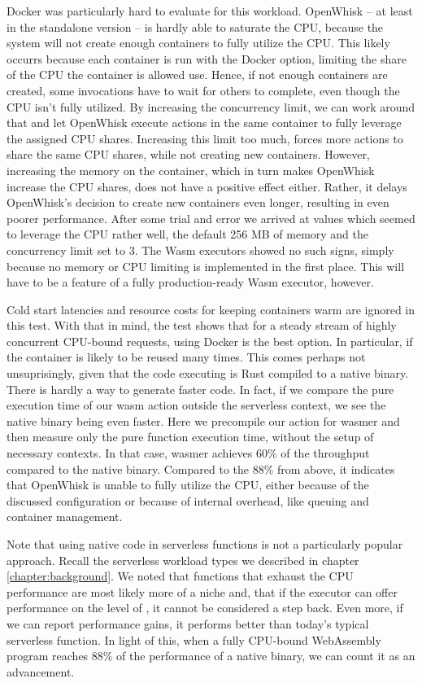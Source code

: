 Docker was particularly hard to evaluate for this workload. OpenWhisk -- at least in the standalone version -- is hardly able to saturate the CPU, because the system will not create enough containers to fully utilize the CPU.
This likely occurrs because each container is run with the  Docker option, limiting the share of the CPU the container is allowed use. Hence, if not enough containers are created, some invocations have to wait for others to complete, even though the CPU isn't fully utilized.
By increasing the concurrency limit, we can work around that and let OpenWhisk execute actions in the same container to fully leverage the assigned CPU shares. Increasing this limit too much, forces more actions to share the same CPU shares, while not creating new containers.
However, increasing the memory on the container, which in turn makes OpenWhisk increase the CPU shares, does not have a positive effect either. Rather, it delays OpenWhisk's decision to create new containers even longer, resulting in even poorer performance. After some trial and error we arrived at values which seemed to leverage the CPU rather well, the default 256 MB of memory and the concurrency limit set to 3.
The Wasm executors showed no such signs, simply because no memory or CPU limiting is implemented in the first place. This will have to be a feature of a fully production-ready Wasm executor, however.

Cold start latencies and resource costs for keeping containers warm are ignored in this test. With that in mind, the test shows that for a steady stream of highly concurrent CPU-bound requests, using Docker is the best option. In particular, if the container is likely to be reused many times. This comes perhaps not unsuprisingly, given that the code executing is Rust compiled to a native  binary. There is hardly a way to generate faster code. In fact, if we compare the pure execution time of our wasm action outside the serverless context, we see the native binary being even faster. Here we precompile our action for wasmer and then measure only the pure function execution time, without the setup of necessary contexts. In that case, wasmer achieves 60\% of the throughput compared to the native binary. Compared to the 88\% from above, it indicates that OpenWhisk is unable to fully utilize the CPU, either because of the discussed configuration or because of internal overhead, like queuing and container management. 

Note that using native code in serverless functions is not a particularly popular approach. Recall the serverless workload types we described in chapter \ref{chapter:background}. We noted that functions that exhaust the CPU performance are most likely more of a niche and, that if the executor can offer performance on the level of , it cannot be considered a step back. Even more, if we can report performance gains, it performs better than today's typical serverless function. In light of this, when a fully CPU-bound WebAssembly program reaches 88\% of the performance of a native binary, we can count it as an advancement. 

